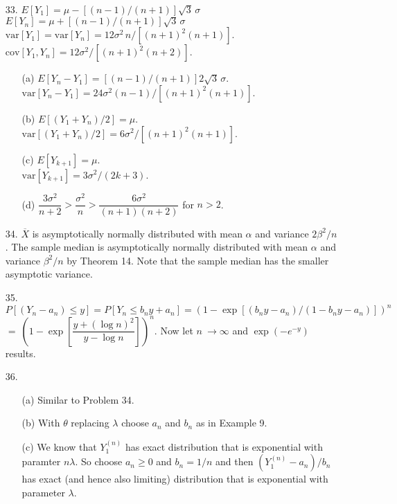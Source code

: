 \begin{enumerate}
	\item[33.] $E[Y_1] = \mu - [(n-1)/(n+1)]\sqrt{3}\, \sigma$ \\
	$E[Y_n] = \mu + [(n-1)/(n+1)]\sqrt{3}\, \sigma$ \\
	$\mbox{var}[Y_1] = \mbox{var}[Y_n] = 12\sigma^2\, n/[(n+1)^2(n+1)]$. \\
	$\mbox{cov}[Y_1,Y_n] = 12\sigma^2/[(n+1)^2(n+2)]$.

	\newpage
	
	\begin{enumerate}
		\item[(a)] $E[Y_n - Y_1] = [(n-1)/(n+1)]2\sqrt{3}\, \sigma$. \\
			$\mbox{var}[Y_n-Y_1] = 24\sigma^2(n-1)/[(n+1)^2(n+1)]$. 
		\item[(b)] $E[(Y_1+Y_n)/2] = \mu.$ \\
			$\mbox{var}[(Y_1+Y_n)/2] = 6\sigma^2/[(n+1)^2(n+1)]$.
		\item[(c)] $E[Y_{k+1}] = \mu$. \\
			$\mbox{var}[Y_{k+1}] = 3\sigma^2/(2k+3)$. 
		\item[(d)] $\dfrac{3\sigma^2}{n+2} > \dfrac{\sigma^2}{n} > \dfrac{6\sigma^2}{(n+1)(n+2)}$ for $n > 2$.
	\end{enumerate}
	
	\item[34.] $\overline{X}$ is asymptotically normally distributed with mean $\alpha$ and variance $2\beta^2/n$. The sample median is asymptotically normally distributed with mean $\alpha$ and variance $\beta^2/n$ by Theorem 14. Note that the sample median has the smaller asymptotic variance. 

	\item[35.] $P[(Y_n-a_n) \le y] = P[Y_n \le b_ny + a_n] = (1 - \exp[(b_ny-a_n)/(1-b_ny-a_n)])^n$ \\
	$=\ (1 - \exp[\dfrac{y+(\log n)^2}{y-\log n}])^n$. Now let $n\ \to \infty$ and $\exp(-e^{-y})$ results.

	\item[36.] \begin{enumerate}
		\item[(a)] Similar to Problem 34.
		\item[(b)] With $\theta$ replacing $\lambda$ choose $a_n$ and $b_n$ as in Example 9.
		\item[(c)] We know that $Y_1^{(n)}$ has exact distribution that is exponential with paramter $n\lambda$. So choose $a_n \ge 0$ and $b_n= 1/n$ and then $(Y_1^{(n)} - a_n)/b_n$ has exact (and hence also limiting) distribution that is exponential with parameter $\lambda$.
 	\end{enumerate}

\end{enumerate}